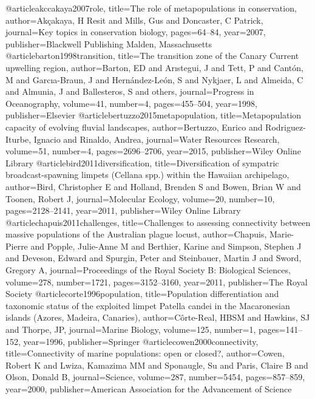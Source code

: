@article{akccakaya2007role,
  title={The role of metapopulations in conservation},
  author={Ak{\c{c}}akaya, H Resit and Mills, Gus and Doncaster, C Patrick},
  journal={Key topics in conservation biology},
  pages={64--84},
  year={2007},
  publisher={Blackwell Publishing Malden, Massachusetts}
}
@article{barton1998transition,
	title={The transition zone of the Canary Current upwelling region},
	author={Barton, ED and Ar{\i}stegui, J and Tett, P and Cant{\'o}n, M and Garc{\i}a-Braun, J and Hern{\'a}ndez-Le{\'o}n, S and Nykjaer, L and Almeida, C and Almunia, J and Ballesteros, S and others},
	journal={Progress in Oceanography},
	volume={41},
	number={4},
	pages={455--504},
	year={1998},
	publisher={Elsevier}
}
@article{bertuzzo2015metapopulation,
	title={Metapopulation capacity of evolving fluvial landscapes},
	author={Bertuzzo, Enrico and Rodriguez-Iturbe, Ignacio and Rinaldo, Andrea},
	journal={Water Resources Research},
	volume={51},
	number={4},
	pages={2696--2706},
	year={2015},
	publisher={Wiley Online Library}
}
@article{bird2011diversification,
	title={Diversification of sympatric broadcast-spawning limpets (Cellana spp.) within the Hawaiian archipelago},
	author={Bird, Christopher E and Holland, Brenden S and Bowen, Brian W and Toonen, Robert J},
	journal={Molecular Ecology},
	volume={20},
	number={10},
	pages={2128--2141},
	year={2011},
	publisher={Wiley Online Library}
}
@article{chapuis2011challenges,
	title={Challenges to assessing connectivity between massive populations of the Australian plague locust},
	author={Chapuis, Marie-Pierre and Popple, Julie-Anne M and Berthier, Karine and Simpson, Stephen J and Deveson, Edward and Spurgin, Peter and Steinbauer, Martin J and Sword, Gregory A},
	journal={Proceedings of the Royal Society B: Biological Sciences},
	volume={278},
	number={1721},
	pages={3152--3160},
	year={2011},
	publisher={The Royal Society}
}
@article{corte1996population,
	title={Population differentiation and taxonomic status of the exploited limpet Patella candei in the Macaronesian islands (Azores, Madeira, Canaries)},
	author={C{\^o}rte-Real, HBSM and Hawkins, SJ and Thorpe, JP},
	journal={Marine Biology},
	volume={125},
	number={1},
	pages={141--152},
	year={1996},
	publisher={Springer}
}
@article{cowen2000connectivity,
	title={Connectivity of marine populations: open or closed?},
	author={Cowen, Robert K and Lwiza, Kamazima MM and Sponaugle, Su and Paris, Claire B and Olson, Donald B},
	journal={Science},
	volume={287},
	number={5454},
	pages={857--859},
	year={2000},
	publisher={American Association for the Advancement of Science}
}
